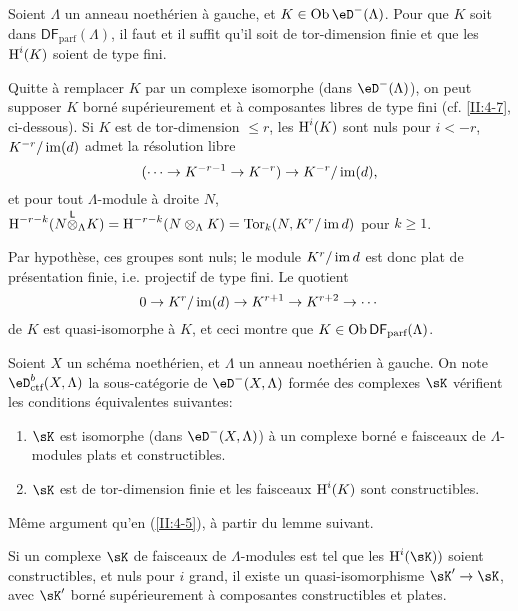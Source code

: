 \begin{lemma}\label{II:4-5-1} 
Soient $\Lambda$ un anneau noethérien à gauche, et $K\in\ob\eD^-(\Lambda)$. 
Pour que $K$ soit dans $\mathsf{DF}_\text{parf}(\Lambda)$, il faut et il suffit 
qu'il soit de tor-dimension finie et que les $\operatorname{H}^i(K)$ soient de type fini.
\end{lemma}

Quitte à remplacer $K$ par un complexe isomorphe (dans $\eD^-(\Lambda)$), on 
peut supposer $K$ borné supérieurement et à composantes libres de type 
fini (cf. \ref{II:4-7}, ci-dessous). Si $K$ est de tor-dimension $\leqslant r$, 
les $\operatorname{H}^i(K)$ sont nuls pour $i<-r$, $K^{-r}/\operatorname{im}(d)$ admet la résolution 
libre 
\[
  (\cdots \to K^{-r-1} \to K^{-r}) \to K^{-r}/\operatorname{im}(d) \text{,}
\]
et pour tout $\Lambda$-module à droite $N$, 
$\operatorname{H}^{-r-k}(N{\overset{\mathsf{L}}{\otimes}}_\Lambda K) = \operatorname{H}^{-r-k}(N\otimes_\Lambda K) 
= \operatorname{Tor}_k(N,K^r/\operatorname{im} d)$ pour $k\geqslant 1$. 

Par hypothèse, ces groupes sont nuls; le module $K^r/\operatorname{im} d$ est donc plat de 
présentation finie, i.e. projectif de type fini. Le quotient 
\[
  0 \to K^r/\operatorname{im}(d) \to K^{r+1} \to K^{r+2}\to \cdots 
\]
de $K$ est quasi-isomorphe à $K$, et ceci montre que 
$K\in\operatorname{Ob}\mathsf{DF}_\text{parf}(\Lambda)$. 





\begin{prop-def_}\label{II:4-6}
Soient $X$ un schéma noethérien, et $\Lambda$ un anneau noethérien à 
gauche. On note $\eD_\textnormal{ctf}^b(X,\Lambda)$ la sous-catégorie de 
$\eD^-(X,\Lambda)$ formée des complexes $\sK$ vérifient les conditions 
équivalentes suivantes:
\begin{enumerate}[\indent i)]
  \item $\sK$ est isomorphe (dans $\eD^-(X,\Lambda)$) à un complexe borné e 
    faisceaux de $\Lambda$-modules plats et constructibles. 
  \item $\sK$ est de tor-dimension finie et les faisceaux $\operatorname{H}^i(K)$ sont 
    constructibles. 
\end{enumerate}
\end{prop-def_}

Même argument qu'en (\ref{II:4-5}), à partir du lemme suivant. 





\begin{lemma_}\label{II:4-7}
Si un complexe $\sK$ de faisceaux de $\Lambda$-modules est tel que les 
$\h^i(\sK))$ soient constructibles, et nuls pour $i$ grand, il existe un 
quasi-isomorphisme $\sK'\to \sK$, avec $\sK'$ borné supérieurement à 
composantes constructibles et plates.
\end{lemma_}

